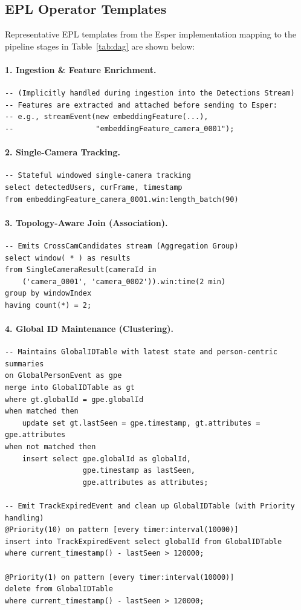 \documentclass[11pt]{article}
\begin{document}
\subsection{EPL Operator Templates}
Representative EPL templates from the Esper implementation mapping to the pipeline stages in Table~\ref{tab:dag} are shown below:

\paragraph{1. Ingestion \& Feature Enrichment.}
\begin{verbatim}
-- (Implicitly handled during ingestion into the Detections Stream)
-- Features are extracted and attached before sending to Esper:
-- e.g., streamEvent(new embeddingFeature(...), 
--                   "embeddingFeature_camera_0001");
\end{verbatim}

\paragraph{2. Single-Camera Tracking.}
\begin{verbatim}
-- Stateful windowed single-camera tracking
select detectedUsers, curFrame, timestamp 
from embeddingFeature_camera_0001.win:length_batch(90)
\end{verbatim}

\paragraph{3. Topology-Aware Join (Association).}
\begin{verbatim}
-- Emits CrossCamCandidates stream (Aggregation Group)
select window( * ) as results 
from SingleCameraResult(cameraId in 
    ('camera_0001', 'camera_0002')).win:time(2 min) 
group by windowIndex 
having count(*) = 2;
\end{verbatim}

\paragraph{4. Global ID Maintenance (Clustering).}
\begin{verbatim}
-- Maintains GlobalIDTable with latest state and person-centric summaries
on GlobalPersonEvent as gpe
merge into GlobalIDTable as gt
where gt.globalId = gpe.globalId
when matched then
    update set gt.lastSeen = gpe.timestamp, gt.attributes = gpe.attributes
when not matched then
    insert select gpe.globalId as globalId, 
                  gpe.timestamp as lastSeen, 
                  gpe.attributes as attributes;

-- Emit TrackExpiredEvent and clean up GlobalIDTable (with Priority handling)
@Priority(10) on pattern [every timer:interval(10000)]
insert into TrackExpiredEvent select globalId from GlobalIDTable
where current_timestamp() - lastSeen > 120000;

@Priority(1) on pattern [every timer:interval(10000)]
delete from GlobalIDTable
where current_timestamp() - lastSeen > 120000;
\end{verbatim}
\end{document}
